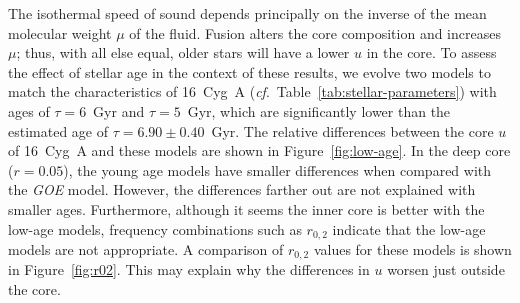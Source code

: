 

The isothermal speed of sound depends principally on the inverse of the mean molecular weight $\mu$ of the fluid. 
Fusion alters the core composition and increases $\mu$; thus, with all else equal, older stars will have a lower $u$ in the core. 
To assess the effect of stellar age in the context of these results, we evolve two models to match the characteristics of 16~Cyg~A (\emph{cf}.~Table~\ref{tab:stellar-parameters}) with ages of ${\tau=6}$~Gyr and ${\tau=5}$~Gyr, which are significantly lower than the estimated age of ${\tau=6.90\pm 0.40}$~Gyr. 
The relative differences between the core ${u}$ of 16~Cyg~A and these models are shown in Figure~\ref{fig:low-age}. 
In the deep core (${r=0.05}$), the young age models have smaller differences when compared with the \emph{GOE} model. 
However, the differences farther out are not explained with smaller ages. 
Furthermore, although it seems the inner core is better with the low-age models, frequency combinations such as ${r_{0,2}}$ \citep{2003A&A...411..215R} indicate that the low-age models are not appropriate. 
A comparison of ${r_{0,2}}$ values for these models is shown in Figure~\ref{fig:r02}.
This may explain why the differences in ${u}$ worsen just outside the core.


